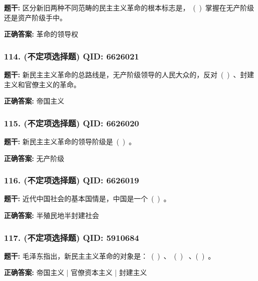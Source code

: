 \documentclass[12pt,UTF8]{ctexart}
\begin{document}
\textbf{题干:}
区分新旧两种不同范畴的民主主义革命的根本标志是， ( ) 掌握在无产阶级还是资产阶级手中。

\textbf{正确答案:}
革命的领导权

\vspace{0.3em}\hrulefill\vspace{0.7em}

\subsubsection*{114. (不定项选择题) \small QID: 6626021}

\textbf{题干:}
新民主主义革命的总路线是，无产阶级领导的人民大众的，反对 ( ) 、封建主义和官僚主义的革命。

\textbf{正确答案:}
帝国主义

\vspace{0.3em}\hrulefill\vspace{0.7em}

\subsubsection*{115. (不定项选择题) \small QID: 6626020}

\textbf{题干:}
新民主主义革命的领导阶级是 ( ) 。

\textbf{正确答案:}
无产阶级

\vspace{0.3em}\hrulefill\vspace{0.7em}

\subsubsection*{116. (不定项选择题) \small QID: 6626019}

\textbf{题干:}
近代中国社会的基本国情是，中国是一个 ( ) 。

\textbf{正确答案:}
半殖民地半封建社会

\vspace{0.3em}\hrulefill\vspace{0.7em}

\subsubsection*{117. (不定项选择题) \small QID: 5910684}

\textbf{题干:}
毛泽东指出，新民主主义革命的对象是： ( ) 、 ( )  、( ) 。

\textbf{正确答案:}
帝国主义 | 官僚资本主义 | 封建主义
\end{document}
